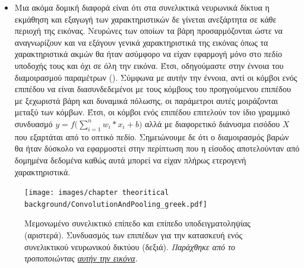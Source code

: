 \begin{itemize}
  \item Μια ακόμα δομική διαφορά είναι ότι στα συνελικτικά νευρωνικά δίκτυα η εκμάθηση και εξαγωγή των χαρακτηριστικών δε γίνεται ανεξάρτητα σε κάθε περιοχή της εικόνας. Νευρώνες των οποίων τα βάρη προσαρμόζονται ώστε να αναγνωρίζουν και να εξάγουν γενικά χαρακτηριστικά της εικόνας όπως τα χαρακτηριστικά ακμών θα ήταν ασύμφορο να είχαν εφαρμογή μόνο στο πεδίο υποδοχής τους και όχι σε όλη την εικόνα. Έτσι, οδηγούμαστε στην έννοια του διαμοιρασμού παραμέτρων (). Σύμφωνα με αυτήν την έννοια, αντί οι κόμβοι ενός επιπέδου να είναι διασυνδεδεμένοι με τους κόμβους του προηγούμενου επιπέδου με ξεχωριστά βάρη και δυναμικά πόλωσης, οι παράμετροι αυτές μοιράζονται μεταξύ των κόμβων. Έτσι, οι κόμβοι ενός επιπέδου επιτελούν τον ίδιο γραμμικό συνδυασμό $y = f\Big(\sum_{i = 1}^{n} w_i \ast x_i  +  b\Big)$ αλλά με διαφορετικό διάνυσμα εισόδου $X$ που εξαρτάται από το οπτικό πεδίο. Σημειώνουμε δε ότι ο διαμοιρασμός βαρών θα ήταν δύσκολο να εφαρμοστεί στην περίπτωση που η είσοδος αποτελούνταν από δομημένα δεδομένα καθώς αυτά μπορεί να είχαν πλήρως ετερογενή χαρακτηριστικά.
\end{itemize}

\begin{figure}[h]
  \centering
  \texttt{[image: images/chapter theoritical background/ConvolutionAndPooling\_greek.pdf]}
  \caption{Μεμονωμένο συνελικτικό επίπεδο και επίπεδο υποδειγματοληψίας (αριστερά). Συνδυασμός των επιπέδων για την κατασκευή ενός συνελικτικού νευρωνικού δικτύου (δεξιά). \textit{Παράχθηκε από το \href{https://inkscape.org/}{} τροποποιώντας \href{https://commons.wikimedia.org/wiki/File:ConvolutionAndPooling.svg}{αυτήν την εικόνα}.}}
  \label{fig:_conv_and_pooling}
\end{figure}

